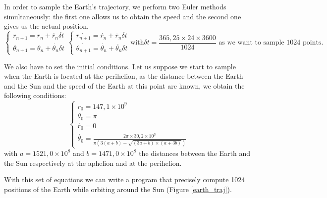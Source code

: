 In order to sample the Earth's trajectory, we perform two Euler methods
simultaneously: the first one allows us to obtain the speed and the second one
gives us the actual position.
\[
    \begin{equation}
        \begin{cases}
            r_{n+1} = r_{n} + \dot{r_{n}} \delta t \\
            \theta_{n+1} = \theta_{n} + \dot{\theta_{n}} \delta t
        \end{cases}
    \end{equation}

    \begin{equation}
        \begin{cases}
            \dot{r_{n+1}} = \dot{r_{n}} + \ddot{r_{n}} \delta t \\
            \dot{\theta_{n+1}} = \dot{\theta_{n}} + \ddot{\theta_{n}} \delta t
        \end{cases}
    \end{equation}

    \text{with}
    \delta t = \frac{365,25 \times 24 \times 3600}{1024}
    \text{ as we want to sample 1024 points.}
\]

We also have to set the initial conditions. Let us suppose we start to sample
when the Earth is located at the perihelion, as the distance between the Earth
and the Sun and the speed of the Earth at this point are known, we obtain the
following conditions:
\[
    \begin{equation}
        \begin{cases}
            r_{0} = 147,1 \times 10^{9} \\
            \theta_{0} = \pi            \\
            \dot{r_{0}} = 0             \\
            \dot{\theta_{0}} = \frac{2\pi \times 30,2 \times 10^{3}}{\pi \left(
                3 (a +
                b) - \sqrt{(3a + b) \times (a + 3b)}\right)}
        \end{cases}
    \end{equation}
\]
with \(a = 1521,0 \times 10^{8}\) and \(b = 1471,0 \times 10^{8}\) the
distances between the Earth and the Sun respectively at the aphelion and at the
perihelion.

With this set of equations we can write a program that precisely compute 1024
positions of the Earth while orbiting around the Sun (Figure \ref{earth_traj}).

